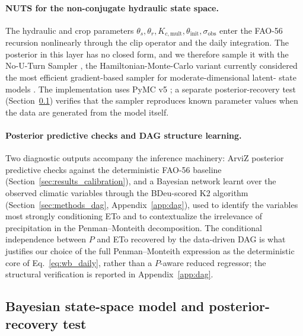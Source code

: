 \documentclass[review,5p,times]{elsarticle}
\begin{document}
\paragraph{NUTS for the non-conjugate hydraulic state space.}
The hydraulic and crop parameters $\theta_s,\theta_r,K_{c,\mathrm{mult}},
\theta_\mathrm{init},\sigma_\mathrm{obs}$ enter the FAO-56 recursion
nonlinearly through the clip operator and the daily integration.
The posterior in this layer has no closed form, and we therefore
sample it with the No-U-Turn Sampler \cite{Hoffman2014}, the
Hamiltonian-Monte-Carlo variant currently considered the most
efficient gradient-based sampler for moderate-dimensional latent-
state models \cite{Betancourt2017}. The implementation uses PyMC v5
\cite{AbrilPla2023}; a separate posterior-recovery test
(Section~\ref{sec:methods_pymc}) verifies that the sampler reproduces
known parameter values when the data are generated from the model
itself.

\paragraph{Posterior predictive checks and DAG structure learning.}
Two diagnostic outputs accompany the inference machinery:
ArviZ \cite{Kumar2019} posterior predictive checks against the
deterministic FAO-56 baseline (Section~\ref{sec:results_calibration}),
and a Bayesian network learnt over the observed climatic variables
through the BDeu-scored K2 algorithm
(Section~\ref{sec:methods_dag}, Appendix~\ref{app:dag}), used to
identify the variables most strongly conditioning ETo and to
contextualize the irrelevance of precipitation in the
Penman--Monteith decomposition. The conditional independence between
$P$ and ETo recovered by the data-driven DAG is what justifies our
choice of the full Penman--Monteith expression as the deterministic
core of Eq.~\ref{eq:wb_daily}, rather than a $P$-aware reduced
regressor; the structural verification is reported in
Appendix~\ref{app:dag}.

\subsection{Bayesian state-space model and posterior-recovery test}
\label{sec:methods_pymc}
\end{document}
